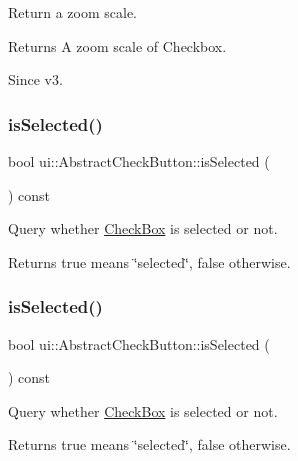 Return a zoom scale. 

\begin{DoxyReturn}{Returns}
A zoom scale of Checkbox. 
\end{DoxyReturn}
\begin{DoxySince}{Since}
v3. 
\end{DoxySince}
\mbox{\label{classui_1_1AbstractCheckButton_ade8bb264515600c46a81947344f4a53b}} 
\subsubsection{\texorpdfstring{is\+Selected()}{isSelected()}\hspace{0.1cm}{\footnotesize\ttfamily [1/2]}}
{\footnotesize\ttfamily bool ui\+::\+Abstract\+Check\+Button\+::is\+Selected (\begin{DoxyParamCaption}{ }\end{DoxyParamCaption}) const}

Query whether \hyperlink{classui_1_1CheckBox}{Check\+Box} is selected or not. \begin{DoxyReturn}{Returns}
true means \char`\"{}selected\char`\"{}, false otherwise. 
\end{DoxyReturn}
\mbox{\label{classui_1_1AbstractCheckButton_ade8bb264515600c46a81947344f4a53b}} 
\subsubsection{\texorpdfstring{is\+Selected()}{isSelected()}\hspace{0.1cm}{\footnotesize\ttfamily [2/2]}}
{\footnotesize\ttfamily bool ui\+::\+Abstract\+Check\+Button\+::is\+Selected (\begin{DoxyParamCaption}{ }\end{DoxyParamCaption}) const}

Query whether \hyperlink{classui_1_1CheckBox}{Check\+Box} is selected or not. \begin{DoxyReturn}{Returns}
true means \char`\"{}selected\char`\"{}, false otherwise. 
\end{DoxyReturn}
\mbox{\label{classui_1_1AbstractCheckButton_a881269a03ef3da6feeb95a97369c1e37}} 
